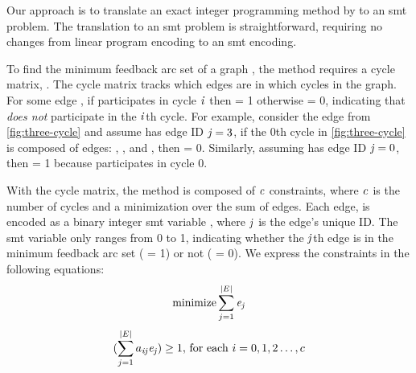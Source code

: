 \label{section:gadgets}
%
Our approach is to translate an exact integer programming method by
\citet{alietall} to an \ac{smt} problem. The translation to an \ac{smt} problem
is straightforward, requiring no changes from linear program encoding to an
\ac{smt} encoding.

To find the minimum feedback arc set of a graph , the method requires a
cycle matrix, . The cycle matrix tracks which edges are in which
cycles in the graph. For some edge , if  participates in
cycle $\mathit{i}$ then  = 1 otherwise  = 0, indicating
that  \emph{does not} participate in the $\mathit{i}$th cycle. For
example, consider the edge  from \autoref{fig:three-cycle} and assume
 has edge ID $\mathit{j} = 3$, if the 0th cycle in
\autoref{fig:three-cycle} is composed of edges: , , and
, then  = 0. Similarly, assuming  has edge
ID $\mathit{j} = 0$, then  = 1 because  participates in
cycle 0.

With the cycle matrix, the method is composed of $\mathit{c}$ constraints, where
$\mathit{c}$ is the number of cycles and a minimization over the sum of edges. Each
edge,  is encoded as a binary integer \ac{smt} variable ,
where $\mathit{j}$ is the edge's unique ID. The \ac{smt} variable  only
ranges from 0 to 1, indicating whether the $\mathit{j}$th edge is in the minimum
feedback arc set ( = 1) or not ( = 0). We express the
constraints in the following equations:
%
\begin{equation}
  \label{one}
 \operatorname*{minimize} \sum_{j=1}^{|E|} \mathit{e_{j}}
\end{equation}
%
\begin{equation}
  \label{two}
  (\sum_{j=1}^{|E|} a_{\mathit{ij}} \mathit{e_{j}}) \ge 1, \, \text{for each } i = 0, 1, 2 \dots{}, c
\end{equation}


